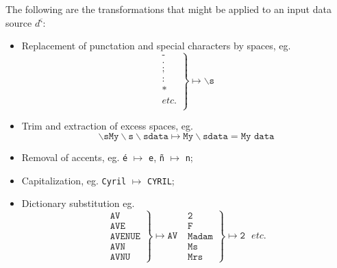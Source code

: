 \documentclass[twoside,twocolumn]{article}
\theoremstyle{definition}
\theoremstyle{remark}
\begin{document}
The following are the transformations that might be applied to an input data source $d^\varsigma$:
\begin{itemize}
    \item Replacement of punctation and special characters by spaces, eg.$$
        \left.
            \begin{array}{r}
                \texttt{-} \\
                \texttt{.} \\
                \texttt{;} \\
                \texttt{:} \\
                \texttt{*} \\
                etc. \\
            \end{array}
        \right\} \mapsto \backslash\texttt{s}
    $$
    \item Trim and extraction of excess spaces, eg.$$
        \backslash\texttt{s} \texttt{My} \backslash\texttt{s} \backslash\texttt{s} \texttt{data} 
            \mapsto \texttt{My} \backslash\texttt{s} \texttt{data} = \texttt{My data}
    $$
    \item Removal of accents, eg. \texttt{é} $\mapsto$ \texttt{e}, \texttt{ñ} $\mapsto$ \texttt{n};
    \item Capitalization, eg. \texttt{Cyril} $\mapsto$  \texttt{CYRIL};
    \item Dictionary substitution eg. $$
        \left.
            \begin{array}{r}
                \texttt{AV} \\
                \texttt{AVE} \\
                \texttt{AVENUE} \\
                \texttt{AVN} \\
                \texttt{AVNU}
            \end{array}
        \right\} \mapsto \texttt{AV} ~~~ 
        \left.
            \begin{array}{r}
                \texttt{2} \\
                \texttt{F} \\
                \texttt{Madam} \\
                \texttt{Ms} \\
                \texttt{Mrs}
            \end{array}
        \right\} \mapsto \texttt{2} ~~~ etc.
    $$
\end{itemize}
\end{document}
